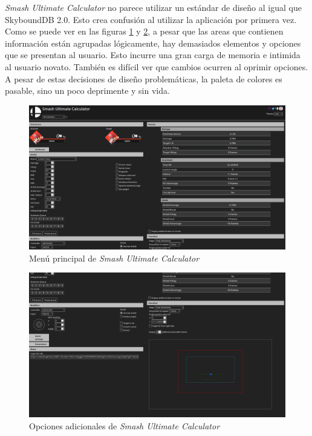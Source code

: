 \newpage

\textit{Smash Ultimate Calculator} no parece utilizar un estándar de diseño al igual que SkyboundDB 2.0. Esto crea confusión al utilizar la aplicación por primera vez. Como se puede ver en las figuras \ref{fig: SUC main menu} y \ref{fig: SUC additional options}, a pesar que las areas que contienen información están agrupadas lógicamente, hay demasiados elementos y opciones que se presentan al usuario. Esto incurre una gran carga de memoria e intimida al usuario novato. También es difícil ver que cambios ocurren al oprimir opciones. A pesar de estas decisiones de diseño problemáticas, la paleta de colores es pasable, sino un poco deprimente y sin vida.

\begin{figure}[ht!]
    \centering
    \includegraphics[width=\textwidth]{figures/SUC1.png}
    \caption{Menú principal de \textit{Smash Ultimate Calculator}}
    \label{fig: SUC main menu}
\end{figure}

\begin{figure}[ht!]
    \centering
    \includegraphics[width=\textwidth]{figures/SUC2.png}
    \caption{Opciones adicionales de \textit{Smash Ultimate Calculator}}
    \label{fig: SUC additional options}
\end{figure}

